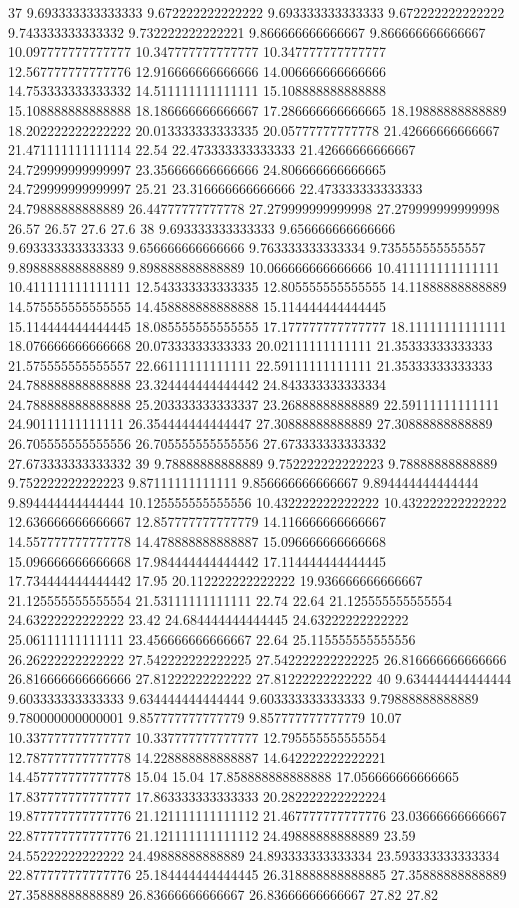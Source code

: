 37 9.693333333333333 9.672222222222222 9.693333333333333 9.672222222222222 9.743333333333332 9.732222222222221 9.866666666666667 9.866666666666667 10.097777777777777 10.347777777777777 10.347777777777777 12.567777777777776 12.916666666666666 14.006666666666666 14.753333333333332 14.511111111111111 15.108888888888888 15.108888888888888 18.186666666666667 17.286666666666665 18.19888888888889 18.202222222222222 20.013333333333335 20.05777777777778 21.42666666666667 21.471111111111114 22.54 22.473333333333333 21.42666666666667 24.729999999999997 23.356666666666666 24.806666666666665 24.729999999999997 25.21 23.316666666666666 22.473333333333333 24.79888888888889 26.44777777777778 27.279999999999998 27.279999999999998 26.57 26.57 27.6 27.6
38 9.693333333333333 9.656666666666666 9.693333333333333 9.656666666666666 9.763333333333334 9.735555555555557 9.898888888888889 9.898888888888889 10.066666666666666 10.411111111111111 10.411111111111111 12.543333333333335 12.805555555555555 14.11888888888889 14.575555555555555 14.458888888888888 15.114444444444445 15.114444444444445 18.085555555555555 17.177777777777777 18.11111111111111 18.076666666666668 20.07333333333333 20.02111111111111 21.35333333333333 21.575555555555557 22.66111111111111 22.59111111111111 21.35333333333333 24.788888888888888 23.324444444444442 24.843333333333334 24.788888888888888 25.203333333333337 23.26888888888889 22.59111111111111 24.90111111111111 26.354444444444447 27.30888888888889 27.30888888888889 26.705555555555556 26.705555555555556 27.673333333333332 27.673333333333332
39 9.78888888888889 9.752222222222223 9.78888888888889 9.752222222222223 9.87111111111111 9.856666666666667 9.894444444444444 9.894444444444444 10.125555555555556 10.432222222222222 10.432222222222222 12.636666666666667 12.857777777777779 14.116666666666667 14.557777777777778 14.478888888888887 15.096666666666668 15.096666666666668 17.984444444444442 17.114444444444445 17.734444444444442 17.95 20.112222222222222 19.936666666666667 21.125555555555554 21.53111111111111 22.74 22.64 21.125555555555554 24.63222222222222 23.42 24.684444444444445 24.63222222222222 25.06111111111111 23.456666666666667 22.64 25.115555555555556 26.26222222222222 27.542222222222225 27.542222222222225 26.816666666666666 26.816666666666666 27.81222222222222 27.81222222222222
40 9.634444444444444 9.603333333333333 9.634444444444444 9.603333333333333 9.79888888888889 9.780000000000001 9.857777777777779 9.857777777777779 10.07 10.337777777777777 10.337777777777777 12.795555555555554 12.787777777777778 14.228888888888887 14.642222222222221 14.457777777777778 15.04 15.04 17.858888888888888 17.056666666666665 17.837777777777777 17.863333333333333 20.282222222222224 19.877777777777776 21.121111111111112 21.467777777777776 23.03666666666667 22.877777777777776 21.121111111111112 24.49888888888889 23.59 24.55222222222222 24.49888888888889 24.893333333333334 23.593333333333334 22.877777777777776 25.184444444444445 26.318888888888885 27.35888888888889 27.35888888888889 26.83666666666667 26.83666666666667 27.82 27.82
